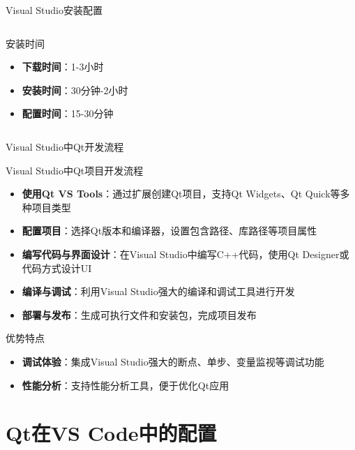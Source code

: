 \documentclass[UTF8,aspectratio=169]{beamer}
\begin{document}
\begin{frame}{Visual Studio安装配置}
\begin{columns}
\begin{column}{0.4\textwidth}
            \begin{ytublock}{安装时间}
                \begin{itemize}
                    \item \textbf{下载时间}：1-3小时
                    \item \textbf{安装时间}：30分钟-2小时
                    \item \textbf{配置时间}：15-30分钟
                \end{itemize}
            \end{ytublock}
        \end{column}
    \end{columns}
\end{frame}

\begin{frame}{Visual Studio中Qt开发流程}
    \begin{ytublock}{Visual Studio中Qt项目开发流程}
        \begin{itemize}
            \item \textbf{使用Qt VS Tools}：通过扩展创建Qt项目，支持Qt Widgets、Qt Quick等多种项目类型
            \item \textbf{配置项目}：选择Qt版本和编译器，设置包含路径、库路径等项目属性
            \item \textbf{编写代码与界面设计}：在Visual Studio中编写C++代码，使用Qt Designer或代码方式设计UI
            \item \textbf{编译与调试}：利用Visual Studio强大的编译和调试工具进行开发
            \item \textbf{部署与发布}：生成可执行文件和安装包，完成项目发布
        \end{itemize}
    \end{ytublock}

    \begin{ytublock}{优势特点}
        \begin{itemize}
            \item \textbf{调试体验}：集成Visual Studio强大的断点、单步、变量监视等调试功能
            \item \textbf{性能分析}：支持性能分析工具，便于优化Qt应用
        \end{itemize}
    \end{ytublock}
\end{frame}

\section{Qt在VS Code中的配置}
\end{document}
